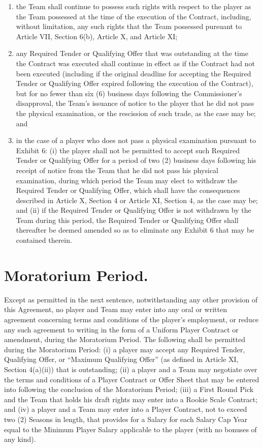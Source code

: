 \documentclass[
]{book}
\providecommand{\tightlist}{%
  \setlength{\itemsep}{0pt}\setlength{\parskip}{0pt}}
\begin{document}
\begin{enumerate}
\def\labelenumi{(\alph{enumi})}
\tightlist
\item
  the Team shall continue to possess such rights with respect to the player as the Team possessed at the time of the execution of the Contract, including, without limitation, any such rights that the Team possessed pursuant to Article VII, Section 6(b), Article X, and Article XI;
\item
  any Required Tender or Qualifying Offer that was outstanding at the time the Contract was executed shall continue in effect as if the Contract had not been executed (including if the original deadline for accepting the Required Tender or Qualifying Offer expired following the execution of the Contract), but for no fewer than six (6) business days following the Commissioner's disapproval, the Team's issuance of notice to the player that he did not pass the physical examination, or the rescission of such trade, as the case may be; and
\item
  in the case of a player who does not pass a physical examination pursuant to Exhibit 6: (i) the player shall not be permitted to accept such Required Tender or Qualifying Offer for a period of two (2) business days following his receipt of notice from the Team that he did not pass his physical examination, during which period the Team may elect to withdraw the Required Tender or Qualifying Offer, which shall have the consequences described in Article X, Section 4 or Article XI, Section 4, as the case may be; and (ii) if the Required Tender or Qualifying Offer is not withdrawn by the Team during this period, the Required Tender or Qualifying Offer shall thereafter be deemed amended so as to eliminate any Exhibit 6 that may be contained therein.
\end{enumerate}

\hypertarget{moratorium-period.}{%
\section{Moratorium Period.}\label{moratorium-period.}}

Except as permitted in the next sentence, notwithstanding any other provision of this Agreement, no player and Team may enter into any oral or written agreement concerning terms and conditions of the player's employment, or reduce any such agreement to writing in the form of a Uniform Player Contract or amendment, during the Moratorium Period. The following shall be permitted during the Moratorium Period: (i) a player may accept any Required Tender, Qualifying Offer, or ``Maximum Qualifying Offer'' (as defined in Article XI, Section 4(a)(ii)) that is outstanding; (ii) a player and a Team may negotiate over the terms and conditions of a Player Contract or Offer Sheet that may be entered into following the conclusion of the Moratorium Period; (iii) a First Round Pick and the Team that holds his draft rights may enter into a Rookie Scale Contract; and (iv) a player and a Team may enter into a Player Contract, not to exceed two (2) Seasons in length, that provides for a Salary for each Salary Cap Year equal to the Minimum Player Salary applicable to the player (with no bonuses of any kind).
\end{document}
